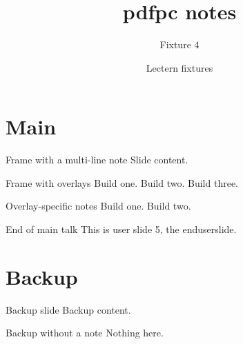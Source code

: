 \documentclass[aspectratio=169]{beamer}
\title{pdfpc notes}
\subtitle{Fixture 4}
\author{Lectern fixtures}
\date{}
\begin{document}
\begin{frame}
  \titlepage
\end{frame}
\section{Main}
\begin{frame}{Frame with a multi-line note}
  Slide content.
\end{frame}
\begin{frame}{Frame with overlays}
  Build one.
  \pause
  Build two.
  \pause
  Build three.
\end{frame}
\begin{frame}{Overlay-specific notes}
  Build one.
  \pause
  Build two.
\end{frame}
\begin{frame}{End of main talk}
  This is user slide 5, the enduserslide.
\end{frame}
\appendix
\section{Backup}
\begin{frame}{Backup slide}
  Backup content.
\end{frame}
\begin{frame}{Backup without a note}
  Nothing here.
\end{frame}
\end{document}
